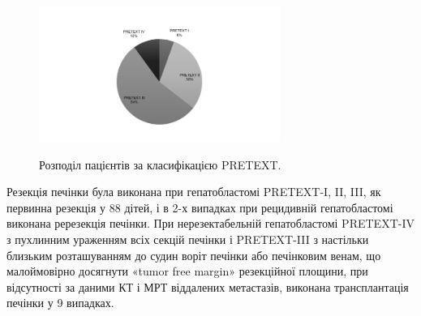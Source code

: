 \begin{figure}[h]
\centering
\includegraphics[width=0.7\textwidth]{Illustrations/pretexpac.jpeg}
\label{fig:pretexpac} %
\caption{Розподіл пацієнтів за класифікацією PRETEXT.}
\end{figure}


Резекція печінки була виконана при гепатобластомі PRETEXT-I, II, III, як первинна резекція у 88 дітей, і в 2-х випадках при рецидивній гепатобластомі виконана ререзекція печінки. При нерезектабельній гепатобластомі PRETEXT-IV з пухлинним ураженням всіх секцій печінки і PRETEXT-III з настільки близьким розташуванням до судин воріт печінки або печінковим венам, що малоймовірно досягнути «tumor free margin» резекційної площини, при відсутності за даними КТ і МРТ віддалених метастазів, виконана трансплантація печінки у 9 випадках.

